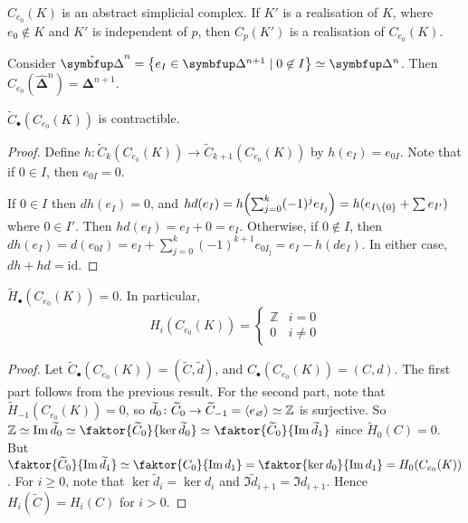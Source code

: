 \begin{remark}
	\( C_{e_0}(K) \) is an abstract simplicial complex.
	If \( K' \) is a realisation of \( K \), where \( e_0 \not\in K \) and \( K' \) is independent of \( p \), then \( C_p(K') \) is a realisation of \( C_{e_0}(K) \).
\end{remark}
\begin{example}
	Consider \( \hat{\bm \Delta} ^n= \qty{e_I \in \bm \Delta^{n+1} \mid 0 \not\in I} \simeq \bm\Delta^n \).
	Then \( C_{e_0}(\hat{\bm \Delta} ^n) = \bm \Delta^{n+1} \).
\end{example}
\begin{proposition}
	\( \widetilde C_\bullet(C_{e_0}(K)) \) is contractible.
\end{proposition}
\begin{proof}
	Define \( h \colon \widetilde C_k(C_{e_0}(K)) \to \widetilde C_{k+1}(C_{e_0}(K)) \) by \( h(e_I) = e_{0I} \).
	Note that if \( 0 \in I \), then \( e_{0I} = 0 \).

	If \( 0 \in I \) then \( dh(e_I) = 0 \), and \( hd(e_I) = h\qty(\sum_{j=0}^k (-1)^j e_{I_{\hat\jmath}}) = h(e_{I \setminus \qty{0}} + \sum e_{I'}) \) where \( 0 \in I' \).
	Then \( hd(e_I) = e_I + 0 = e_I \).
	Otherwise, if \( 0 \not\in I \), then \( dh(e_I) = d(e_{0I}) = e_I + \sum_{j=0}^k (-1)^{k+1} e_{0I_{\hat\jmath}} = e_I - h(de_I) \).
	In either case, \( dh + hd = \mathrm{id} \).
\end{proof}
\begin{corollary}
	\( \widetilde H_\bullet(C_{e_0}(K)) = 0 \).
	In particular,
	\[ H_i(C_{e_0}(K)) = \begin{cases}
		\mathbb Z & i = 0 \\
		0 & i \neq 0
	\end{cases} \]
\end{corollary}
\begin{proof}
	Let \( \widetilde C_\bullet(C_{e_0}(K)) = (\widetilde C, \widetilde d) \), and \( C_\bullet(C_{e_0}(K)) = (C, d) \).
	The first part follows from the previous result.
	For the second part, note that \( \widetilde H_{-1}(C_{e_0}(K)) = 0 \), so \( \widetilde d_0 \colon \widetilde C_0 \to \widetilde C_{-1} = \left\langle{} e_\varnothing \right\rangle \simeq \mathbb Z \) is surjective.
	So \( \mathbb Z \simeq \Im \widetilde d_0 \simeq \faktor{\widetilde C_0}{\ker \widetilde d_0} \simeq \faktor{\widetilde C_0}{\Im \widetilde d_1} \) since \( \widetilde H_0(C) = 0 \).
	But \( \faktor{\widetilde C_0}{\Im \widetilde d_1} \simeq \faktor{C_0}{\Im d_1} = \faktor{\ker d_0}{\Im d_1} = H_0(C_{e_0}(K)) \).
	For \( i \geq 0 \), note that \( \ker \widetilde d_i = \ker d_i \) and \( \Im \widetilde d_{i+1} = \Im d_{i+1} \).
	Hence \( H_i(\widetilde C) = H_i(C) \) for \( i > 0 \).
\end{proof}
